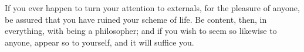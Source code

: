 If you ever happen to turn your attention to externals, for the pleasure
of anyone, be assured that you have ruined your scheme of life. Be
content, then, in everything, with being a philosopher; and if you wish
to seem so likewise to anyone, appear so to yourself, and it will suffice
you.
